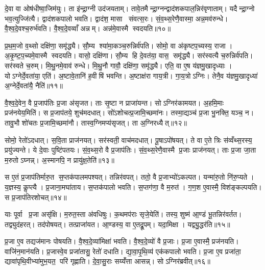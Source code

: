 दे॒वा वा ओष॑धीष्वा॒जिम॑युः। ता इ॑न्द्रा॒ग्नी उद॑जयताम्। तावे॒तमैन्द्रा॒ग्नन्द्वाद॑शकपाल॒न्निर॑वृणाताम्। यदैन्द्रा॒ग्नो भव॒त्युज्जि॑त्यै। द्वाद॑शकपालो भवति। द्वाद॑श॒ मासा संवत्स॒रः। सं॒व॒थ्स॒रेणै॒वास्मा॒ अन्न॒मव॑रुन्धे। वै॒श्व॒दे॒वश्च॒रुर्भ॑वति। वै॒श्व॒दे॒वव्वाँ अन्नम्। अन्न॑मे॒वास्मै स्वदयति॥१०॥

प्र॒थ॒म॒जो व॒थ्सो दक्षि॑णा॒ समृ॑द्ध्यै। सौ॒म्य श्या॑मा॒कञ्च॒रुन्निर्व॑पति। सोमो॒ वा अ॑कृष्टप॒च्यस्य॒ राजा। अ॒कृ॒ष्ट॒प॒च्यमे॒वास्मै स्वदयति। वासो॒ दक्षि॑णा। सौ॒म्य हि दे॒वत॑या॒ वास॒ समृ॑द्ध्यै। सर॑स्वत्यै च॒रुन्निर्व॑पति। सर॑स्वते च॒रुम्। मि॒थु॒नमे॒वाव॑ रुन्धे। मि॒थु॒नौ गावौ॒ दक्षि॑णा॒ समृ॑द्ध्यै। एति॒ वा ए॒ष य॑ज्ञमु॒खादृध्याः। योऽग्नेर्दे॒वता॑या॒ एति॑। अ॒ष्टावे॒तानि॑ ह॒वीषि॑ भवन्ति। अ॒ष्टाक्ष॑रा गाय॒त्री। गा॒य॒त्रोऽग्निः। तेनै॒व य॑ज्ञमु॒खादृध्या॑ अ॒ग्नेर्दे॒वता॑यै॒ नैति॑॥११॥

वै॒श्व॒दे॒वेन॒ वै प्र॒जाप॑तिः प्र॒जा अ॑सृजत। ताः सृ॒ष्टा न प्राजा॑यन्त। सोऽग्निर॑कामयत। अ॒हमि॒माः प्रज॑नयेय॒मिति॑। स प्र॒जाप॑तये॒ शुच॑मदधात्। सो॑ऽशोचत्प्र॒जामि॒च्छमा॑नः। तस्मा॒द्यञ्च॑ प्र॒जा भु॒नक्ति॒ यञ्च॒ न। तावु॒भौ शो॑चतः प्र॒जामि॒च्छमा॑नौ। तास्व॒ग्निमप्य॑सृजत्। ता अ॒ग्निरध्यैत्॥१२॥

सोमो॒ रेतो॑ऽदधात्। स॒वि॒ता प्राज॑नयत्। सर॑स्वती॒ वाच॑मदधात्। पू॒षाऽपो॑षयत्। ते वा ए॒ते त्रिः स॑व्वँथ्स॒रस्य॒ प्रयु॑ज्यन्ते। ये दे॒वाः पुष्टि॑पतयः। सं॒व॒थ्स॒रो वै प्र॒जाप॑तिः। सं॒व॒थ्स॒रेणै॒वास्मै प्र॒जाः प्राज॑नयत्। ताः प्र॒जा जा॒ता म॒रुतोऽघ्नन्न्। अ॒स्मानपि॒ न प्रायु॑क्ष॒तेति॑॥१३॥

स ए॒तं प्र॒जाप॑तिर्मारु॒त स॒प्तक॑पालमपश्यत्। तन्निर॑वपत्। ततो॒ वै प्र॒जाभ्यो॑ऽकल्पत। यन्मा॑रु॒तो नि॑रु॒प्यते। य॒ज्ञस्य॒ कॢप्त्यै। प्र॒जाना॒मघा॑ताय। स॒प्तक॑पालो भवति। स॒प्तग॑णा॒ वै म॒रुत॑। ग॒ण॒श ए॒वास्मै॒ विश॑ङ्कल्पयति। स प्र॒जाप॑तिरशोचत्॥१४॥

याः पूर्वा प्र॒जा असृ॑क्षि। म॒रुत॒स्ता अ॑वधिषुः। क॒थमप॑राः सृजे॒येति॑। तस्य॒ शुष्म॑ आ॒ण्डं भू॒तन्निर॑वर्तत। तद्व्युद॑हरत्। तद॑पोषयत्। तत्प्राजा॑यत। आ॒ण्डस्य॒ वा ए॒तद्रू॒पम्। यदा॒मिक्षा। यद्व्यु॒द्धर॑ति॥१५॥

प्र॒जा ए॒व तद्यज॑मानः पोषयति। वै॒श्व॒दे॒व्या॑मिक्षा॑ भवति। वै॒श्व॒दे॒व्यो॑ वै प्र॒जाः। प्र॒जा ए॒वास्मै॒ प्रज॑नयति। वाजि॑न॒मान॑यति। प्र॒जास्वे॒व प्रजा॑तासु॒ रेतो॑ दधाति। द्या॒वा॒पृ॒थि॒व्य॑ एक॑कपालो भवति। प्र॒जा ए॒व प्रजा॑ता॒ द्यावा॑पृथि॒वीभ्या॑मुभ॒यत॒ परि॑ गृह्णाति। दे॒वा॒सु॒राः सय्यँ॑त्ता आसन्न्। सोऽग्निर॑ब्रवीत्॥१६॥

